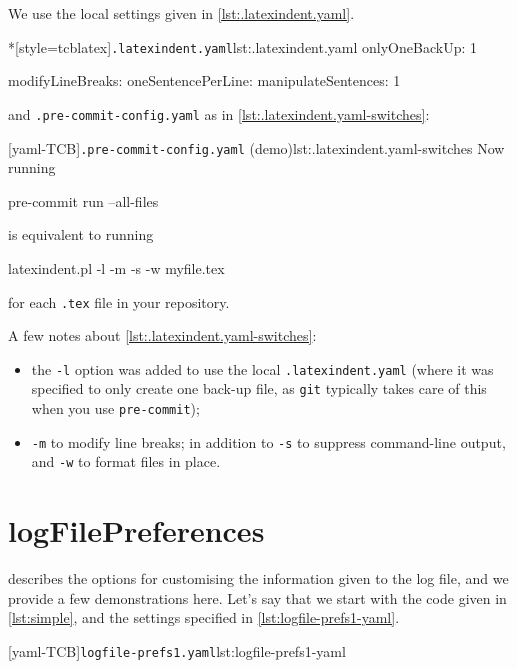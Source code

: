 		\begin{example}
			We use the local settings given in \cref{lst:.latexindent.yaml}.
			\begin{cmhlistings}*[style=tcblatex]{\texttt{.latexindent.yaml}}{lst:.latexindent.yaml}
onlyOneBackUp: 1

modifyLineBreaks:
 oneSentencePerLine:
   manipulateSentences: 1
\end{cmhlistings}

			and \texttt{.pre-commit-config.yaml} as in \cref{lst:.latexindent.yaml-switches}:

			[yaml-TCB]{\texttt{.pre-commit-config.yaml} (demo)}{lst:.latexindent.yaml-switches}
			Now running
			\begin{commandshell}
pre-commit run --all-files  
\end{commandshell}
			is equivalent to running
			\begin{commandshell}
latexindent.pl -l -m -s -w myfile.tex
\end{commandshell}
			for each \texttt{.tex} file in your repository.

			A few notes about \cref{lst:.latexindent.yaml-switches}:
			\begin{itemize}
				\item the \texttt{-l} option was added to use the local \texttt{.latexindent.yaml} (where it
				      was specified to only create one back-up file, as \texttt{git} typically takes care of
				      this when you use \texttt{pre-commit});
				\item \texttt{-m} to modify line breaks; in addition to \texttt{-s} to suppress command-line
				      output,
				      and \texttt{-w} to format files in place.
			\end{itemize}
		\end{example}

	\section{logFilePreferences}\label{app:logfile-demo}
	  describes the options for customising the information given
	 to the log file, and we provide a few demonstrations here. Let's say that we start with
	 the code given in \cref{lst:simple}, and the settings specified in
	 \cref{lst:logfile-prefs1-yaml}.

	 \begin{minipage}{.35\linewidth}
	 \end{minipage}
	 \hfill
	 \begin{minipage}{.6\linewidth}
		 [yaml-TCB]{\texttt{logfile-prefs1.yaml}}{lst:logfile-prefs1-yaml}
	 \end{minipage}

